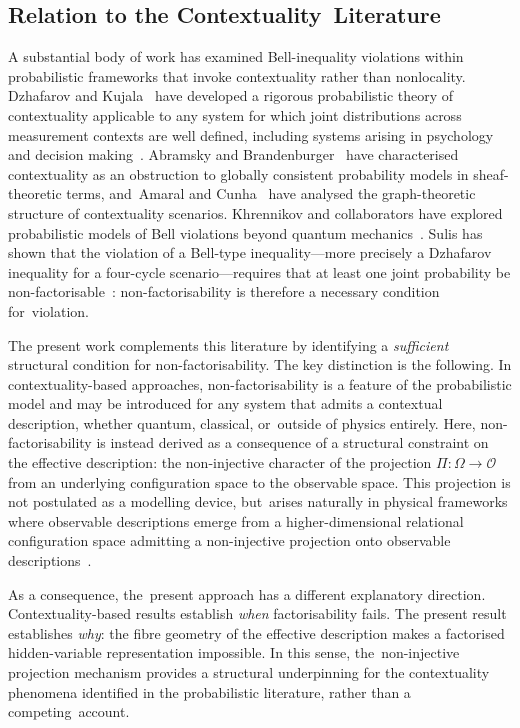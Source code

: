 \documentclass[quantumrep,article,accept,pdftex,oneauthor]{Definitions/mdpi}
\theoremstyle{remark}
\begin{document}
  \subsection{Relation to the Contextuality~Literature}
    \label{subsec:contextuality-literature}

    A substantial body of work has examined Bell-inequality violations within
    probabilistic frameworks that invoke contextuality rather than nonlocality.
    Dzhafarov and Kujala~\cite{Dzhafarov2017} have developed a rigorous probabilistic
    theory of contextuality applicable to any system for which joint distributions across
    measurement contexts are well defined, including systems arising in psychology and
    decision making~\cite{Sulis2025}.
    Abramsky and Brandenburger~\cite{AbramskyBrandenburger2011} have characterised
    contextuality as an obstruction to globally consistent probability models in sheaf-theoretic
    terms, and~Amaral and Cunha~\cite{Amaral2018} have analysed the graph-theoretic
    structure of contextuality scenarios.
    Khrennikov and collaborators have explored probabilistic models of Bell violations
    beyond quantum mechanics~\cite{Haven2014}.
    Sulis has shown that the violation of a Bell-type inequality---more precisely a
    Dzhafarov inequality for a four-cycle scenario---requires that at least one joint
    probability be non-factorisable~\cite{Sulis2025}: non-factorisability is therefore
    a necessary condition for~violation.

    The present work complements this literature by identifying a \emph{sufficient}
    structural condition for non-factorisability.
    The key distinction is the following.
    In contextuality-based approaches, non-factorisability is a feature of the
    probabilistic model and may be introduced for any system that admits a contextual
    description, whether quantum, classical, or~outside of physics entirely.
    Here, non-factorisability is instead derived as a consequence of a structural
    constraint on the effective description: the non-injective character of the projection
    $\Pi : \Omega \to \mathcal{O}$ from an underlying configuration space to the observable
    space.
    This projection is not postulated as a modelling device, but~arises naturally in
    physical frameworks where observable descriptions emerge from a higher-dimensional
    relational configuration space admitting a non-injective projection
    onto observable descriptions~\cite{Beau2026a}.

    As a consequence, the~present approach has a different explanatory direction.
    Contextuality-based results establish \emph{when} factorisability fails.
    The present result establishes \emph{why}: the fibre geometry of the effective
    description makes a factorised hidden-variable representation impossible.
    In this sense, the~non-injective projection mechanism provides a structural
    underpinning for the contextuality phenomena identified in the probabilistic
    literature, rather than a competing~account.
\end{document}
